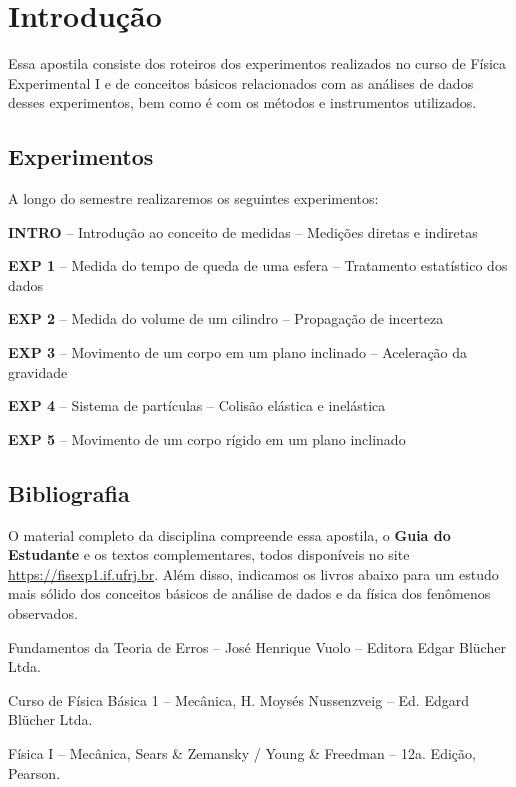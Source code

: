 \chapter*{Introdução}\vspace{-1.5cm}
Essa apostila consiste dos roteiros dos experimentos realizados no curso de Física Experimental I e de  conceitos b\'asicos relacionados com as análises de dados desses experimentos, bem como é com os métodos e instrumentos utilizados.
\vspace{-0.5cm}
\section*{Experimentos}

A longo do semestre realizaremos os seguintes experimentos:

\begin{descrip}
\item [\bf INTRO] -- Introdução ao conceito de medidas -- Medições diretas e indiretas
\item[\bf EXP 1] -- Medida do tempo de queda de uma esfera -- Tratamento estatístico dos dados
\item[\bf EXP 2] -- Medida do volume de um cilindro -- Propagação de incerteza
\item[\bf EXP 3] -- Movimento de um corpo em um plano inclinado -- Aceleração da gravidade 
\item[\bf EXP 4] -- Sistema de partículas -- Colisão elástica e inelástica
\item[\bf EXP 5] -- Movimento de um corpo rígido em um plano inclinado
\end{descrip}

\vspace{-0.5cm}
\section*{Bibliografia}

O material completo da disciplina compreende essa apostila, o {\bf Guia do Estudante} e os textos complementares, todos disponíveis no site \newline \url{https://fisexp1.if.ufrj.br}. Além disso, indicamos os livros abaixo para um estudo mais sólido dos conceitos básicos de análise de dados e da física dos fenômenos observados.
\vspace{-0.5cm}
\begin{descrip}
\item Fundamentos da Teoria de Erros – José Henrique Vuolo – Editora Edgar Blücher Ltda. 

\item Curso de Física Básica 1 – Mecânica, H. Moysés Nussenzveig – Ed. Edgard Blücher Ltda.

\item Física I – Mecânica, Sears \& Zemansky / Young \& Freedman – 12a. Edição, Pearson.
\end{descrip}